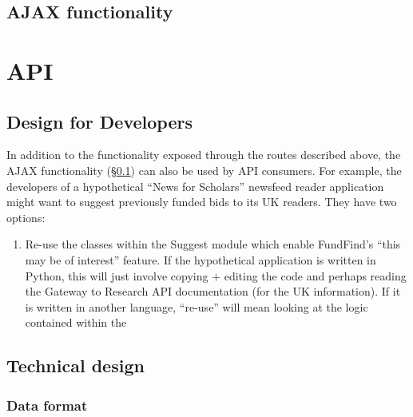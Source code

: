 \subsection{AJAX functionality}
\label{design-ajax}

\section{API}
  \subsection{Design for Developers}
    
    In addition to the functionality exposed through the routes described above, the AJAX functionality (\S\ref{design-ajax}) can also be used by API consumers. For example, the developers of a hypothetical ``News for Scholars'' newsfeed reader application might want to suggest previously funded bids to its UK readers. They have two options:
    
    \begin{enumerate}
     \item Re-use the classes within the Suggest module which enable FundFind's ``this may be of interest'' feature. If the hypothetical application is written in Python, this will just involve copying $+$ editing the code and perhaps reading the Gateway to Research API documentation (for the UK information). If it is written in another language, ``re-use'' will mean looking at the logic contained within the 
    \end{enumerate}

  \subsection{Technical design}
  \subsubsection{Data format}





